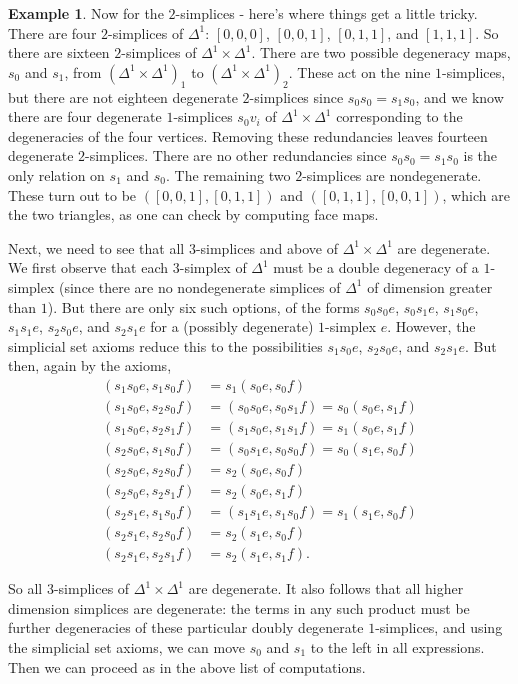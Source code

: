 \documentclass[12pt]{article}
\theoremstyle{plain}
\theoremstyle{definition}
\newtheorem{example}[theorem]{Example}
\begin{document}
\begin{example}
Now for the $2$-simplices - here's where things get a little tricky. There are four $2$-simplices of $\Delta^1$: $[0,0,0]$, $[0,0,1]$, $[0,1,1]$, and $[1,1,1]$.  So there are sixteen $2$-simplices of $\Delta^1\times \Delta^1$. There are two possible degeneracy maps,  $s_0$ and $s_1 $, from $(\Delta^1\times \Delta^1)_1$ to $(\Delta^1\times \Delta^1)_2$. These act on the nine $1$-simplices, but there are not eighteen degenerate $2$-simplices since $s_0s_0=s_1s_0$, and we know there are four degenerate $1$-simplices $s_0v_i$ of $\Delta^1\times \Delta^1$ corresponding to the degeneracies of the four vertices. Removing these redundancies leaves fourteen degenerate $2$-simplices. There are no other redundancies since $s_0s_0=s_1s_0$ is the only relation on $s_1$ and $s_0$. The remaining two $2$-simplices are nondegenerate. These turn out to be $([0,0,1],[0,1,1])$ and $([0,1,1],[0,0,1])$, which are the two triangles, as one can check by computing face maps. 

Next, we need to  see that all $3$-simplices and above of $\Delta^1\times \Delta^1$  are degenerate. We first observe that each $3$-simplex of $\Delta^1$  must be a double degeneracy of a $1$-simplex (since there are no nondegenerate simplices of $\Delta^1$ of dimension greater than $1$). But there are only six such options, of the forms $s_0s_0e$, $s_0s_1e$, $s_1s_0e$, $s_1s_1e$, $s_2s_0e$, and $s_2s_1e$ for a (possibly degenerate) $1$-simplex $e$. However, the simplicial set axioms reduce this to the possibilities $s_1s_0e$, $s_2s_0e$, and $s_2s_1e$. But then, again by the axioms, 
\begin{align*}
(s_1s_0e  ,s_1s_0f)&= s_1(s_0e,s_0f) \\
(s_1s_0e  ,s_2s_0f)&=(s_0s_0e  ,s_0s_1f)=s_0(s_0e  ,s_1f) \\
(s_1s_0e  ,s_2s_1f)&= (s_1s_0e  ,s_1s_1f)= s_1(s_0e  ,s_1f) \\
(s_2s_0e  ,s_1s_0f)&= (s_0s_1e    , s_0s_0f  )=s_0(s_1e    , s_0f  )\\
(s_2s_0e  ,s_2s_0f)&=s_2(s_0e  ,s_0f)   \\
(s_2s_0e  ,s_2s_1f)&= s_2(s_0e  ,s_1f)  \\
(s_2s_1e  ,s_1s_0f)&=(s_1s_1e  ,s_1s_0f)= s_1(s_1e  ,s_0f) \\
(s_2s_1e  ,s_2s_0f)&= s_2(s_1e  ,s_0f)  \\
(s_2s_1e  ,s_2s_1f)&= s_2(s_1e  ,s_1f).  
\end{align*}

So all $3$-simplices of $\Delta^1\times \Delta^1$ are degenerate. It also follows that all higher dimension simplices are degenerate:  the terms in any such product  must be further degeneracies of these particular doubly degenerate $1$-simplices, and using the simplicial set axioms, we can move $s_0$ and $s_1$ to the left in all expressions. Then we can proceed as in the above list of computations.
\end{example}
\end{document}
